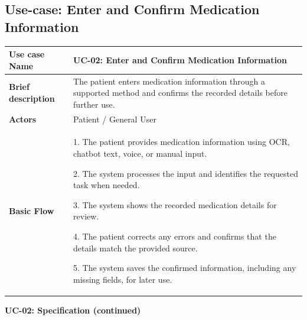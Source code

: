 
\clearpage
\subsection{Use-case: Enter and Confirm Medication Information}
\label{uc:uc-02}

\begin{longtable}{|p{}|p{}|}
\hline
\textbf{Use case Name} & UC-02: Enter and Confirm Medication Information \\ \hline
\textbf{Brief description} & The patient enters medication information through a supported method and confirms the recorded details before further use. \\ \hline
\textbf{Actors} & Patient / General User \\ \hline
\textbf{Basic Flow} &
1. The patient provides medication information using OCR, chatbot text, voice, or manual input.\par
2. The system processes the input and identifies the requested task when needed.\par
3. The system shows the recorded medication details for review.\par
4. The patient corrects any errors and confirms that the details match the provided source.\par
5. The system saves the confirmed information, including any missing fields, for later use.
\\ \hline
\end{longtable}
\clearpage
\noindent\textbf{UC-02: Specification (continued)}
